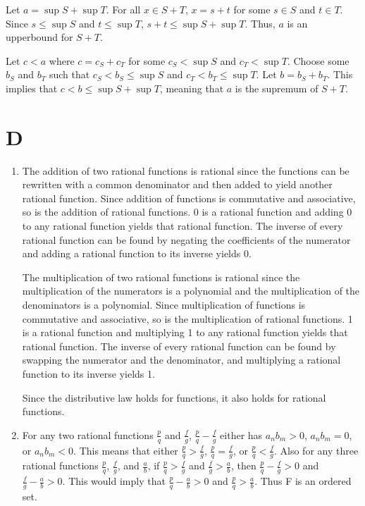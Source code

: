 \documentclass{article}
\begin{document}
    Let $a=\sup S + \sup T$.
    For all $x \in S + T$, $x=s + t$ for some $s \in S$ and $t \in T$.
    Since $s \leq \sup S$ and  $t \leq \sup T$, 
    $s + t \leq \sup S + \sup T$.
    Thus, $a$ is an upperbound for $S + T$.

    Let $c < a$ where $c = c_S + c_T$ for some $c_S < \sup S$ and $c_T < \sup T$.
    Choose some $b_S$ and $b_T$ such that
    $c_S< b_S \leq \sup S$ and $c_T< b_T \leq \sup T$.
    Let $b = b_S + b_T$.
    This implies that 
    $c < b \leq \sup S + \sup T$, meaning that $a$ is the supremum of $S+T$.
\newpage
\section*{D}
\begin{enumerate}
    \item The addition of two rational functions is rational
    since the functions can be rewritten with a common denominator and then added to yield another rational function.
    Since addition of functions is commutative and associative, so is the addition of rational functions.
    0 is a rational function and adding 0 to any rational function yields that rational function.
    The inverse of every rational function can be found by negating the coefficients of the numerator and
    adding a rational function to its inverse yields 0.

    The multiplication of two rational functions is rational
    since the multiplication of the numerators is a polynomial and the multiplication of the denominators is a polynomial.
    Since multiplication of functions is commutative and associative, so is the multiplication of rational functions.
    1 is a rational function and multiplying 1 to any rational function yields that rational function.
    The inverse of every rational function can be found by swapping the numerator and the denominator, and 
    multiplying a rational function to its inverse yields 1.

    Since the distributive law holds for functions, it also holds for rational functions.
    \item For any two rational functions $\frac{p}{q}$ and $\frac{f}{g}$, $\frac{p}{q} - \frac{f}{g}$ 
    either has $a_nb_m > 0$, $a_nb_m = 0$, or $a_nb_m < 0$.
    This means that either $\frac{p}{q} > \frac{f}{g}$, 
    $\frac{p}{q} = \frac{f}{g}$, or $\frac{p}{q} < \frac{f}{g}$.
    Also for any three rational functions $\frac{p}{q}$, $\frac{f}{g}$, and $\frac{a}{b}$,
    if $\frac{p}{q} > \frac{f}{g}$ and $\frac{f}{g} > \frac{a}{b}$, then
    $\frac{p}{q} - \frac{f}{g} > 0$ and $\frac{f}{g} - \frac{a}{b} > 0$. This would imply that 
    $\frac{p}{q} - \frac{a}{b} > 0$ and $\frac{p}{q} > \frac{a}{b}$.
    Thus F is an ordered set.


\end{enumerate}
\end{document}
